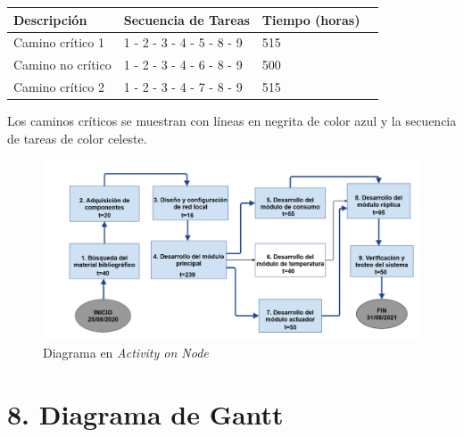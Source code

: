 \documentclass[11pt]{charter}
\begin{document}
\begin{table}[ht]
\begin{tabularx}{\linewidth}{@{}|l|X|X|l|@{}}
\hline
\rowcolor[HTML]{C0C0C0} 
Descripción        & Secuencia de Tareas    & Tiempo (horas) 	\\ \hline
Camino crítico 1   & 1 - 2 - 3 - 4 - 5 - 8 - 9 & 515	 \\ \hline
Camino no crítico  & 1 - 2 - 3 - 4 - 6 - 8 - 9 & 500	 \\ \hline
Camino crítico 2   & 1 - 2 - 3 - 4 - 7 - 8 - 9 & 515  \\ \hline
\end{tabularx}
\end{table}
Los caminos críticos se muestran con líneas en negrita de color azul y la secuencia de tareas de color celeste.




\begin{figure}[htpb]
\centering 
\includegraphics[width=1.0\textwidth]{./Figuras/AoN.png}
\caption{Diagrama en \textit{Activity on Node}}
\label{fig:AoN}
\end{figure}



\section{8. Diagrama de Gantt}
\label{sec:gantt}
\end{document}
